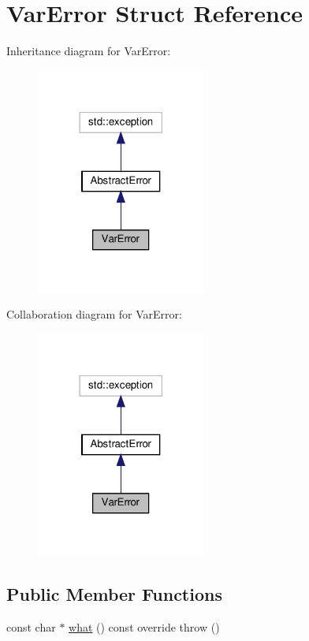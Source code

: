 \hypertarget{structVarError}{}\section{Var\+Error Struct Reference}
\label{structVarError}


Inheritance diagram for Var\+Error\+:\nopagebreak
\begin{figure}[H]
\begin{center}
\leavevmode
\includegraphics[width=158pt]{structVarError__inherit__graph}
\end{center}
\end{figure}


Collaboration diagram for Var\+Error\+:\nopagebreak
\begin{figure}[H]
\begin{center}
\leavevmode
\includegraphics[width=158pt]{structVarError__coll__graph}
\end{center}
\end{figure}
\subsection*{Public Member Functions}
\begin{DoxyCompactItemize}
\item 
const char $\ast$ \hyperlink{structVarError_a48ee904c5e61633cb6f4b9af2d093eaa}{what} () const override  throw ()
\end{DoxyCompactItemize}



